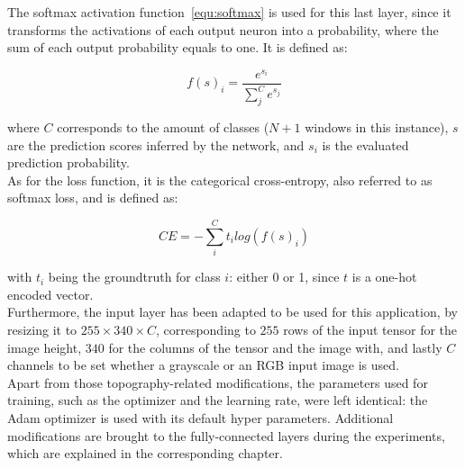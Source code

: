 The softmax activation function~\ref{equ:softmax} is used for this last layer,
since it transforms the activations of each output neuron into a probability,
where the sum of each output probability equals to one. It is defined as:

\begin{equation}
	\label{equ:softmax}
	f(s)_i=\frac{e^{s_i}}{\sum_j^C e^{s_j}}
\end{equation}

where $C$ corresponds to the amount of classes ($N+1$ windows in this
instance), $s$ are the prediction scores inferred by the network, and $s_i$ is
the evaluated prediction probability.\\

As for the loss function, it is the categorical cross-entropy, also referred to
as softmax loss, and is defined as:

\begin{equation}
	\label{equ:catcrossentr}
	CE=\displaystyle-\sum_i^C t_i log(f(s)_i)
\end{equation}

with $t_i$ being the groundtruth for class $i$: either 0 or 1, since $t$ is a
one-hot encoded vector.\\


Furthermore, the input layer has been adapted to be used for this application,
by resizing it to $255\times340\times C$, corresponding to $255$ rows of the
input tensor for the image height, $340$ for the columns of the tensor and the
image with, and lastly $C$ channels to be set whether a grayscale or an RGB
input image is used.\\

Apart from those topography-related modifications, the parameters used for
training, such as the optimizer and the learning rate, were left identical: the
Adam optimizer is used with its default hyper parameters. Additional
modifications are brought to the fully-connected layers during the experiments,
which are explained in the corresponding chapter.
